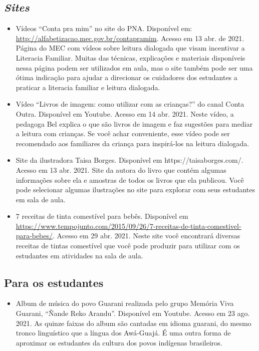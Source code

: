 \documentclass[11pt]{extarticle}
\begin{document}
\subsection{\textit{Sites}}

\begin{itemize}
\item Vídeos “Conta pra mim” no site do PNA. Disponível em: \url{http://alfabetizacao.mec.gov.br/contapramim}. 
Acesso em 13 abr. de 2021.
Página do MEC com vídeos sobre leitura dialogada que visam incentivar a Literacia Familiar. Muitas das 
técnicas, explicações e materiais disponíveis nessa página podem ser utilizados em aula, mas o site também 
pode ser uma ótima indicação para ajudar a direcionar os cuidadores dos estudantes a praticar 
a literacia familiar e leitura dialogada.

\item Vídeo “Livros de imagem: como utilizar com as crianças?” do canal Conta Outra. Disponível em Youtube. 
Acesso em 14 abr. 2021. 
Neste vídeo, a pedagoga Bel explica o que são livros de imagem e faz sugestões para mediar a leitura com 
crianças. Se você achar conveniente, esse vídeo pode ser recomendado aos familiares da criança 
para inspirá-los na leitura dialogada. 

\item Site da ilustradora Taisa Borges. Disponível em https://taisaborges.com/. Acesso em 13 abr. 2021. 
Site da autora do livro que contém algumas informações sobre ela e amostras de todos os livros que ela publicou. 
Você pode selecionar algumas ilustrações no site para explorar com seus estudantes em sala de aula. 

\item 7 receitas de tinta comestível para bebês. 
Disponível em \url{https://www.tempojunto.com/2015/09/26/7-receitas-de-tinta-comestivel-para-bebes/}. 
Acesso em 29 abr. 2021. 
Neste site você encontrará diversas receitas de tintas comestível que você pode produzir 
para utilizar com os estudantes em atividades na sala de aula. 
\end{itemize}

\subsection{Para os estudantes}
\begin{itemize}

\item Album de música do povo Guarani realizada pelo grupo Memória Viva Guarani,
``Ñande Reko Arandu''. Disponível em Youtube. Acesso em 23 ago. 2021. 
As quinze faixas do album são cantadas em idioma guarani, do mesmo tronco 
linguístico que a língua dos Awá-Guajá. É uma outra forma de aproximar 
os estudantes da cultura dos povos indígenas brasileiros. 


\end{itemize}
\end{document}
